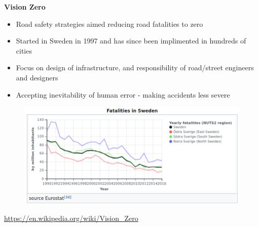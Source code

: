 \documentclass[aspectratio=169]{beamer}
\begin{document}
\begin{frame}
	
	\textbf{Vision Zero}
	
	\vspace{2mm}
	
	\begin{itemize}
		\item Road safety strategies aimed reducing road fatalities to zero
		\item Started in Sweden in 1997 and has since been implimented in hundreds of cities
		\item Focus on design of infrastructure, and responsibility of road/street engineers and designers
		\item Accepting inevitability of human error - making accidents less severe
	\end{itemize}

	\begin{figure}
		\centering
		\includegraphics[width=0.75\linewidth]{images/sweden_road_fatalities.png}
		
	\end{figure}
	\tiny{\url{https://en.wikipedia.org/wiki/Vision_Zero}}


	
\end{frame}
\end{document}

